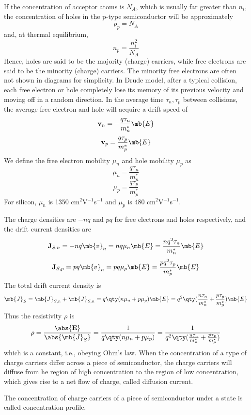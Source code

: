 \documentclass[a4paper,12pt]{article}
\begin{document}
If the concentration of acceptor atoms is $N_A$, which is usually far greater than $n_i$, the concentration of holes in the p-type semiconductor will be approximately
\[p_p=N_A\]
and, at thermal equilibrium,
\[n_p=\frac{n_i^2}{N_A}\]
Hence, holes are said to be the majority (charge) carriers, while free electrons are said to be the minority (charge) carriers. The minority free electrons are often not shown in diagrams for simplicity.
In Drude model, after a typical collision, each free electron or hole completely lose its memory of its previous velocity and moving off in a random direction. In the average time $\tau_n,\tau_p$ between collisions, the average free electron and hole will acquire a drift speed of
\[\mathbf{v}_n=-\frac{q\tau_n}{m_n^*}\mb{E}\]
\[\mathbf{v}_p=\frac{q\tau_p}{m_p^*}\mb{E}\]
We define the free electron mobility $\mu_n$ and hole mobility $\mu_p$ as
\[\mu_n=\frac{q\tau_n}{m_n^*}\]
\[\mu_p=\frac{q\tau_p}{m_p^*}\]
For silicon, $\mu_n$ is 1350 cm$^2$V$^{-1}$s$^{-1}$ and $\mu_p$ is 480 cm$^2$V$^{-1}$s$^{-1}$.

The charge densities are $-nq$ and $pq$ for free electrons and holes respectively, and the drift current densities are
\[\mathbf{J}_{S,n}=-nq\mb{v}_n=nq\mu_n\mb{E}=\frac{nq^2\tau_n}{m_n^*}\mb{E}\]
\[\mathbf{J}_{S,p}=pq\mb{v}_n=pq\mu_p\mb{E}=\frac{pq^2\tau_p}{m_p^*}\mb{E}\]
The total drift current density is
\[\mb{J}_S=\mb{J}_{S,n}+\mb{J}_{S,n}=q\qty(n\mu_n+p\mu_p)\mb{E}=q^2\qty(\frac{n\tau_n}{m_n^*}+\frac{p\tau_p}{m_p^*})\mb{E}\]
Thus the resistivity $\rho$ is
\[\rho=\frac{\abs{\mathbf{E}}}{\abs{\mb{J}_S}}=\frac{1}{q\qty(n\mu_n+p\mu_p)}=\frac{1}{q^2\qty(\frac{n\tau_n}{m_n^*}+\frac{p\tau_p}{m_p^*})}\]
which is a constant, i.e., obeying Ohm's law.
When the concentration of a type of charge carriers differ across a piece of semiconductor, the charge carriers will diffuse from he region of high concentration to the region of low concentration, which gives rise to a net flow of charge, called diffusion current.

The concentration of charge carriers of a piece of semiconductor under a state is called concentration profile.
\end{document}
